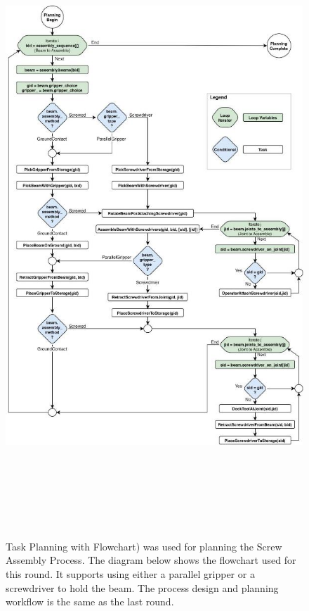 \documentclass[11pt]{book}
\begin{document}
\begin{figure}[H]
\includegraphics[width=15.92cm,height=23.42cm]{./images/image14.jpeg}
\caption{Task Planning with Flowchart) was used for planning the Screw Assembly Process. The diagram below shows the flowchart used for this round. It supports using either a parallel gripper or a screwdriver to hold the beam. The process design and planning workflow is the same as the last round.}
\label{fig:task_planning_flowchart_was_used}
\end{figure}
\end{document}
